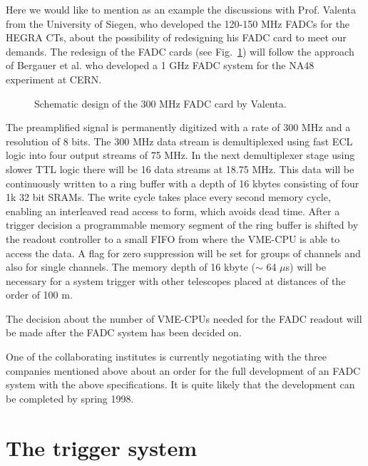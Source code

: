 Here we would like to mention as an example the discussions with Prof.
Valenta from the University of Siegen, who developed the 120-150 MHz FADCs
for the HEGRA CTs, about the possibility of redesigning his FADC card to
meet our demands. The redesign of the FADC cards (see Fig.~\ref{fig-fadc})
will
follow the approach of Bergauer et al. \cite{bergauer:96} who developed a 1
GHz FADC system for the NA48 experiment at CERN. 
\begin{figure}[htb] \centering \leavevmode
\epsfxsize=8cm
\caption{\label{fig-fadc}
Schematic design of the 300 MHz FADC card by Valenta.}
\end{figure}

The preamplified signal is
permanently digitized with a rate of 300 MHz and a resolution of 8 bits. The
300 MHz data stream is demultiplexed using fast ECL logic into four output
streams of 75 MHz. In the next demultiplexer stage using slower TTL logic
there will be 16 data streams at 18.75 MHz. This data will be continuously
written to a ring buffer with a depth of 16 kbytes consisting of four 1k 32
bit SRAMs. The write cycle takes place every second memory cycle, enabling
an interleaved read access to form, which avoids dead time. After a trigger
decision a programmable memory segment of the ring buffer is shifted by the
readout controller to a small FIFO from where the VME-CPU is able to access
the data. A flag for zero suppression will be set for groups of channels and
also for single channels. The memory depth of 16 kbyte ($\sim $ 64 $\mu $s)
will be necessary for a system trigger with other telescopes placed at
distances of the order of 100 m.

The decision about the number of VME-CPUs needed for the FADC readout will
be made after the FADC system has been decided on.

One of the collaborating institutes is currently negotiating with the three
companies mentioned above about an order for the full development of an FADC
system with the above specifications. It is quite likely that the
development can be completed by spring 1998.

\section{The trigger system}


\medskip

